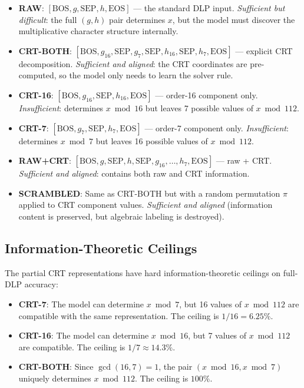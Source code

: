\begin{itemize}[leftmargin=*]
    \item \textbf{RAW}: $[\text{BOS}, g, \text{SEP}, h, \text{EOS}]$ --- the standard DLP input. \emph{Sufficient but difficult}: the full $(g, h)$ pair determines $x$, but the model must discover the multiplicative character structure internally.
    \item \textbf{CRT-BOTH}: $[\text{BOS}, g_{16}, \text{SEP}, g_7, \text{SEP}, h_{16}, \text{SEP}, h_7, \text{EOS}]$ --- explicit CRT decomposition. \emph{Sufficient and aligned}: the CRT coordinates are pre-computed, so the model only needs to learn the solver rule.
    \item \textbf{CRT-16}: $[\text{BOS}, g_{16}, \text{SEP}, h_{16}, \text{EOS}]$ --- order-16 component only. \emph{Insufficient}: determines $x \bmod 16$ but leaves 7 possible values of $x \bmod 112$.
    \item \textbf{CRT-7}: $[\text{BOS}, g_7, \text{SEP}, h_7, \text{EOS}]$ --- order-7 component only. \emph{Insufficient}: determines $x \bmod 7$ but leaves 16 possible values of $x \bmod 112$.
    \item \textbf{RAW+CRT}: $[\text{BOS}, g, \text{SEP}, h, \text{SEP}, g_{16}, \ldots, h_7, \text{EOS}]$ --- raw + CRT. \emph{Sufficient and aligned}: contains both raw and CRT information.
    \item \textbf{SCRAMBLED}: Same as CRT-BOTH but with a random permutation $\pi$ applied to CRT component values. \emph{Sufficient and aligned} (information content is preserved, but algebraic labeling is destroyed).
\end{itemize}


\subsection{Information-Theoretic Ceilings}
\label{sec:ceilings}

The partial CRT representations have hard information-theoretic ceilings on full-DLP accuracy:

\begin{itemize}[leftmargin=*]
    \item \textbf{CRT-7}: The model can determine $x \bmod 7$, but 16 values of $x \bmod 112$ are compatible with the same representation. The ceiling is $1/16 = 6.25\%$.
    \item \textbf{CRT-16}: The model can determine $x \bmod 16$, but 7 values of $x \bmod 112$ are compatible. The ceiling is $1/7 \approx 14.3\%$.
    \item \textbf{CRT-BOTH}: Since $\gcd(16, 7) = 1$, the pair $(x \bmod 16, x \bmod 7)$ uniquely determines $x \bmod 112$. The ceiling is $100\%$.
\end{itemize}

